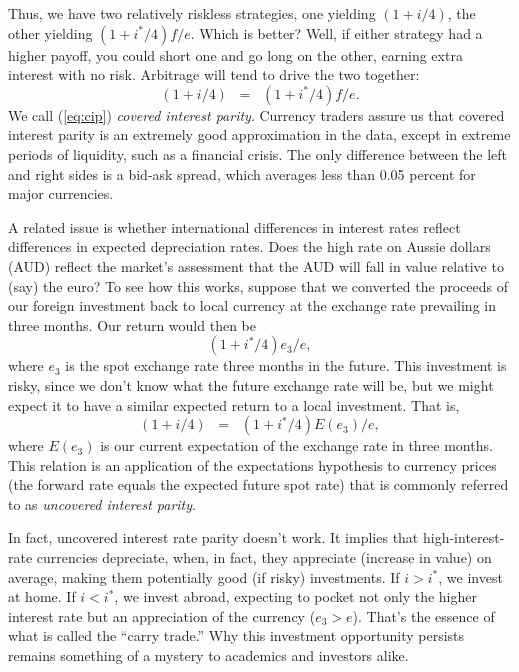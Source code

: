Thus, we have two relatively riskless  strategies, one yielding
$(1+i/4)$, the other yielding $(1+i^{*}/4)f/e$. Which is better?
Well, if either strategy had a higher payoff, you could short one
and go long on the other, earning extra interest with no risk.
Arbitrage will tend to drive the two together:
\begin{equation}
                            (1+i/4) \;\;=\;\; (1+i^{*}/4)f/e.
                            \label{eq:cip}
\end{equation}
We call (\ref{eq:cip}) {\it covered interest parity\/}.
Currency traders assure us that covered interest parity
is an extremely good approximation in the data, except in extreme periods of liquidity,
such as a financial crisis. The only difference between the left and right sides is a bid-ask spread,
which averages less than 0.05 percent for major currencies.


A related issue is whether international differences
in interest rates reflect differences in expected depreciation rates.
Does the high rate on Aussie dollars (AUD)
reflect the market's assessment that
the AUD will fall in value relative to (say) the euro?
To see how this works, suppose
that we converted the proceeds of our foreign investment
back to local currency at the exchange rate prevailing
in three months.  Our return would then be
\[
                            (1+i^{*}/4) e_{3}/e ,
\]
where $e_3$ is the spot exchange rate three months in the future.
This investment is risky, since we don't know what the
future exchange rate will be, but we might expect
it to have a similar expected return to a local investment.
That is,
\begin{equation}
          (1+i/4) \;\;=\;\; (1+i^{*}/4) E (e_{3})/e ,
          \label{eq:uip}
\end{equation}
where $E(e_3)$ is our current expectation
of the exchange rate in three months.
This relation is an application of the expectations hypothesis to
currency prices (the forward rate equals the expected future spot rate)
that is commonly referred to as {\it uncovered interest parity\/}. 


In fact, uncovered interest rate parity doesn't work.
It implies that high-interest-rate currencies depreciate,
when, in fact, they appreciate (increase in value) on average,
making them potentially good (if risky) investments.
If $i>i^*$, we invest at home.  If $i<i^*$, we invest abroad,
expecting to pocket not only the higher interest rate but
an appreciation of the currency ($e_3>e$).
That's the essence of what is called the ``carry trade.''
Why this investment opportunity persists remains something of a mystery to
academics and investors alike.

